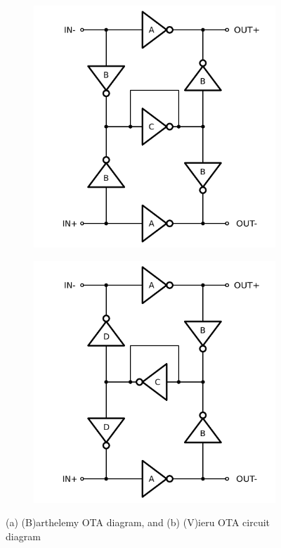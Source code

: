 \documentclass[conference]{IEEEtran}
\begin{document}
	\begin{figure}[htbp]
		\centering
		\begin{subfigure}[b]{0.45\columnwidth}
			\centerline{\includegraphics[scale=0.50]{circuits/barth.pdf}}
			\caption{}
			\label{fig:barth:sch}
		\end{subfigure}
		\begin{subfigure}[b]{0.45\columnwidth}
			\centerline{\includegraphics[scale=0.50]{circuits/vieru.pdf}}
			\caption{}
			\label{fig:vieru:sch}
		\end{subfigure}
		\caption{(a) (B)arthelemy OTA diagram\cite{barthelemy2008ota}, and (b) (V)ieru OTA circuit diagram \cite{vieru2012ultra}}
	\end{figure}
	
\end{document}
